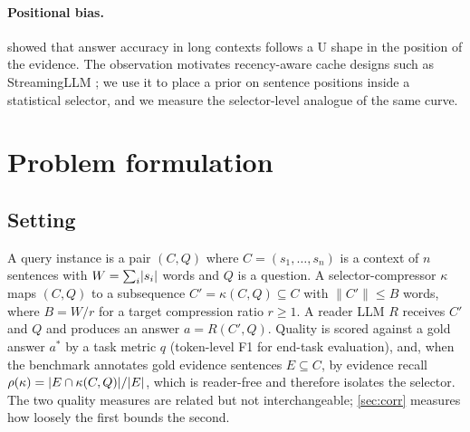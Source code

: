 \documentclass[review,12pt]{elsarticle}
\DeclarePairedDelimiter\abs{\lvert}{\rvert}
\theoremstyle{remark}
\begin{document}
\paragraph{Positional bias.}
\citet{liu2023lost} showed that answer accuracy in long contexts
follows a U shape in the position of the evidence. The observation
motivates recency-aware cache designs such as StreamingLLM
\citep{xiao2023streaming}; we use it to place a prior on sentence
positions inside a statistical selector, and we measure the
selector-level analogue of the same curve.

\section{Problem formulation}
\label{sec:formulation}

\subsection{Setting}
A query instance is a pair $(C, Q)$ where $C = (s_1, \ldots, s_n)$ is
a context of $n$ sentences with $W = \sum_i \abs{s_i}$ words and $Q$
is a question. A selector-compressor $\kappa$ maps $(C, Q)$ to a
subsequence $C' = \kappa(C, Q) \subseteq C$ with
$\lVert C' \rVert \le B$ words, where $B = W / r$ for a target
compression ratio $r \ge 1$. A reader LLM $R$ receives $C'$ and $Q$
and produces an answer $a = R(C', Q)$. Quality is scored against a
gold answer $a^{*}$ by a task metric $q$ (token-level F1 for end-task
evaluation), and, when the benchmark annotates gold evidence sentences
$E \subseteq C$, by evidence recall
$\rho(\kappa) = \abs{E \cap \kappa(C, Q)} / \abs{E}$, which is
reader-free and therefore isolates the selector. The two quality
measures are related but not interchangeable; \autoref{sec:corr}
measures how loosely the first bounds the second.
\end{document}
